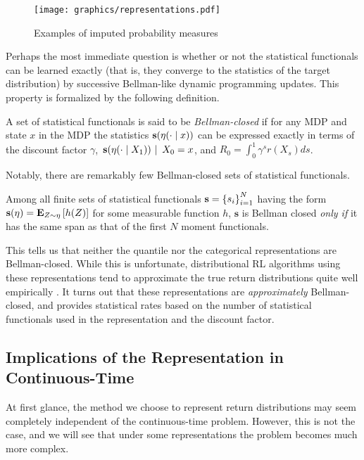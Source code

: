 \begin{figure}[h]
  \centering
  \texttt{[image: graphics/representations.pdf]}
  \caption{Examples of imputed probability measures}
  \label{fig:representations}
\end{figure}

Perhaps
the most immediate question is whether or not the statistical
functionals can be learned exactly (that is, they converge to the
statistics of the target distribution) by successive Bellman-like
dynamic programming updates. This property is formalized by the
following definition.

\begin{definition}
  A set of statistical functionals is said to be \emph{Bellman-closed}
  if for any MDP and state $x$ in the MDP the statistics
  $\mathbf{s}(\returnmeasure(\cdot\mid x))$ can be expressed exactly in
  terms of the discount factor $\gamma$,
  $\Conditional{\mathbf{s}(\returnmeasure(\cdot\mid X_1))}{X_0=x}$,
  and $R_0 = \int_0^1\gamma^sr(X_s)ds$.
\end{definition}

Notably, there are remarkably few Bellman-closed sets of statistical
functionals.

\begin{theorem}
  Among all finite sets of statistical functionals $\mathbf{s} =
  \indexedint{i}{N}{s}$ having the form
  $\mathbf{s}(\returnmeasure)=\expectation{Z\sim\returnmeasure}{h(Z)}$
  for some measurable function $h$, $\mathbf{s}$ is Bellman closed
  \emph{only if} it has the same span as that of the first $N$ moment
  functionals.
\end{theorem}

This tells us that neither the quantile nor the categorical
representations are Bellman-closed. While this is unfortunate,
distributional RL algorithms using these representations tend to
approximate the true return distributions quite well empirically
\citep{hessel2018rainbow, bellemare2020autonomous}. It turns out that
these representations are \emph{approximately} Bellman-closed, and
\citet{Rowland48495} provides statistical rates based on the number of
statistical functionals used in the representation and the discount factor.

\subsection{Implications of the Representation in Continuous-Time}
At first glance, the method we choose to represent return
distributions may seem completely independent of the continuous-time
problem. However, this is not the case, and we will see that under some
representations the problem becomes much more complex.

